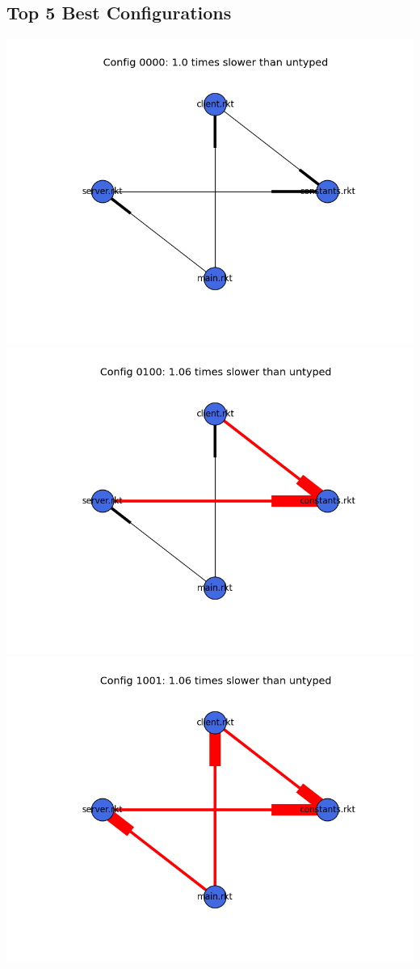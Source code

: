 \documentclass{article}
\begin{document}
\begin{itemize}
\subsection{Top 5 Best Configurations}
\includegraphics[width=\textwidth]{echo-module-graph-0000.png}
\includegraphics[width=\textwidth]{echo-module-graph-0100.png}
\includegraphics[width=\textwidth]{echo-module-graph-1001.png}

\end{itemize}
\end{document}
